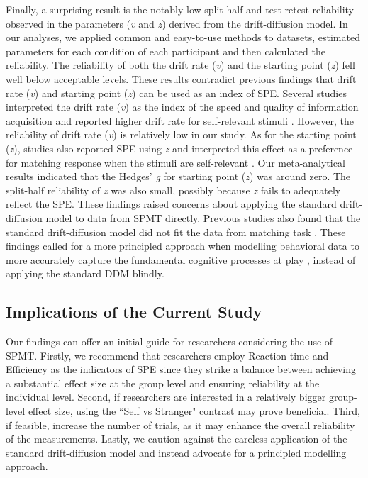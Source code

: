 \documentclass[sn-apa]{sn-jnl}%
\theoremstyle{thmstyleone}%
\theoremstyle{thmstyletwo}%
\theoremstyle{thmstylethree}%
\begin{document}
Finally, a surprising result is the notably low split-half and test-retest reliability observed in the parameters (\textit{v} and \textit{z}) derived from the drift-diffusion model. In our analyses, we applied common and easy-to-use methods to datasets, estimated parameters for each condition of each participant and then calculated the reliability. The reliability of both the drift rate (\textit{v}) and the starting point (\textit{z}) fell well below acceptable levels. These results contradict previous findings that drift rate (\textit{v}) and starting point (\textit{z}) can be used as an index of SPE. Several studies interpreted the drift rate (\textit{v}) as the index of the speed and quality of information acquisition and reported higher drift rate for self-relevant stimuli \parencite[e.g.,][]{golubickis2017self,golubickis2020parts}. However, the reliability of drift rate (\textit{v}) is relatively low in our study. As for the starting point (\textit{z}), studies also reported SPE using \textit{z} and interpreted this effect as a preference for matching response when the stimuli are self-relevant \parencite[e.g.,][]{macrae2017self,reuther2017does}. Our meta-analytical results indicated that the Hedges' \textit{g }for starting point (\textit{z}) was around zero. The split-half reliability of \textit{z} was also small, possibly because \textit{z} fails to adequately reflect the SPE. These findings raised concerns about applying the standard drift-diffusion model to data from SPMT directly. Previous studies also found that the standard drift-diffusion model did not fit the data from matching task \parencite{groulx2020ez}. These findings called for a more principled approach when modelling behavioral data to more accurately capture the fundamental cognitive processes at play \parencite[e.g.,][]{wilson2019ten}, instead of applying the standard DDM blindly.  


\subsection{Implications of the Current Study}\label{subsec:impl}
Our findings can offer an initial guide for researchers considering the use of SPMT. Firstly, we recommend that researchers employ Reaction time and Efficiency as the indicators of SPE since they strike a balance between achieving a substantial effect size at the group level and ensuring reliability at the individual level. Second, if researchers are interested in a relatively bigger group-level effect size, using the ``Self vs Stranger" contrast may prove beneficial. Third, if feasible, increase the number of trials, as it may enhance the overall reliability of the measurements. Lastly, we caution against the careless application of the standard drift-diffusion model and instead advocate for a principled modelling approach.
\end{document}
